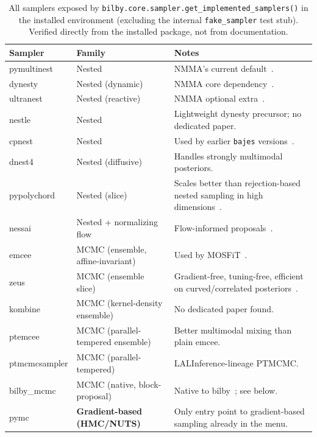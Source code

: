 \documentclass[11pt]{article}
\newcommand{\code}[1]{\texttt{#1}}
\begin{document}
\begin{table}[htbp]
\centering
\small
\begin{tabular}{@{}p{2.6cm}p{2.3cm}p{9.0cm}@{}}
\toprule
\textbf{Sampler} & \textbf{Family} & \textbf{Notes} \\
\midrule
pymultinest & Nested & NMMA's current default~\cite{Feroz:2008xx}. \\
dynesty & Nested (dynamic) & NMMA core dependency~\cite{Speagle:2019ivv}. \\
ultranest & Nested (reactive) & NMMA optional extra~\cite{Buchner:2021cql}. \\
nestle & Nested & Lightweight dynesty precursor; no dedicated paper. \\
cpnest & Nested & Used by earlier \code{bajes} versions~\cite{Breschi:2021wzr}. \\
dnest4 & Nested (diffusive) & Handles strongly multimodal posteriors. \\
pypolychord & Nested (slice) & Scales better than rejection-based nested sampling in high dimensions~\cite{Handley:2015vkr}. \\
nessai & Nested + normalizing flow & Flow-informed proposals~\cite{Williams:2021qyt,Williams:2023ppp}. \\
emcee & MCMC (ensemble, affine-invariant) & Used by MOSFiT~\cite{Guillochon:2017bmg}. \\
zeus & MCMC (ensemble slice) & Gradient-free, tuning-free, efficient on curved/correlated posteriors~\cite{Karamanis:2021tsx}. \\
kombine & MCMC (kernel-density ensemble) & No dedicated paper found. \\
ptemcee & MCMC (parallel-tempered ensemble) & Better multimodal mixing than plain emcee. \\
ptmcmcsampler & MCMC (parallel-tempered) & LALInference-lineage PTMCMC. \\
bilby\_mcmc & MCMC (native, block-proposal) & Native to bilby~\cite{Ashton:2021anp}; see below. \\
pymc & \textbf{Gradient-based (HMC/NUTS)} & Only entry point to gradient-based sampling already in the menu. \\
\bottomrule
\end{tabular}
\caption{All samplers exposed by \code{bilby.core.sampler.get\_implemented\_samplers()} in
the installed environment (excluding the internal \code{fake\_sampler} test stub). Verified
directly from the installed package, not from documentation.}
\label{tab:menu}
\end{table}
\end{document}
